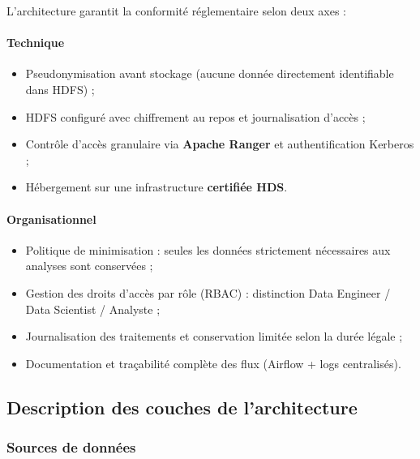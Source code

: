 \documentclass[12pt,a4paper]{article}
\begin{document}
L'architecture garantit la conformité réglementaire selon deux axes :

\paragraph{Technique}
\begin{itemize}[leftmargin=*]
    \item Pseudonymisation avant stockage (aucune donnée directement identifiable dans HDFS) ;
    \item HDFS configuré avec chiffrement au repos et journalisation d'accès ;
    \item Contrôle d'accès granulaire via \textbf{Apache Ranger} et authentification Kerberos ;
    \item Hébergement sur une infrastructure \textbf{certifiée HDS}.
\end{itemize}

\paragraph{Organisationnel}
\begin{itemize}[leftmargin=*]
    \item Politique de minimisation : seules les données strictement nécessaires aux analyses sont conservées ;
    \item Gestion des droits d'accès par rôle (RBAC) : distinction Data Engineer / Data Scientist / Analyste ;
    \item Journalisation des traitements et conservation limitée selon la durée légale ;
    \item Documentation et traçabilité complète des flux (Airflow + logs centralisés).
\end{itemize}

\subsection{Description des couches de l'architecture}

\subsubsection{Sources de données}
\end{document}
